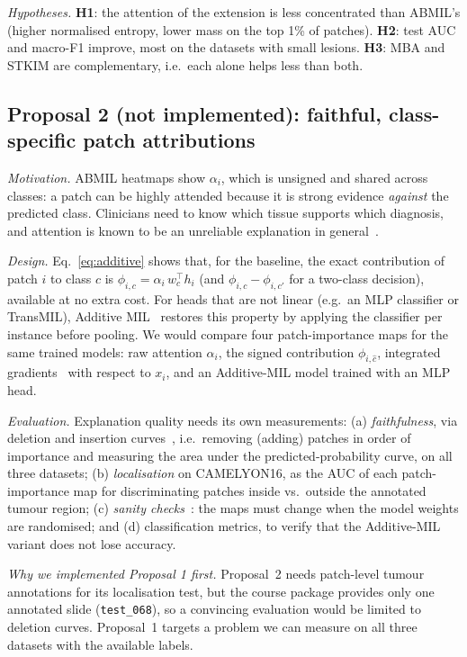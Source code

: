 \documentclass[conference]{IEEEtran}
\begin{document}
\emph{Hypotheses.} \textbf{H1}: the attention of the extension is less concentrated than ABMIL's (higher normalised entropy, lower mass on the top 1\% of patches). \textbf{H2}: test AUC and macro-F1 improve, most on the datasets with small lesions. \textbf{H3}: MBA and STKIM are complementary, i.e.\ each alone helps less than both.

\subsection{Proposal 2 (not implemented): faithful, class-specific patch attributions}\label{sec:p2}
\emph{Motivation.} ABMIL heatmaps show $\alpha_i$, which is unsigned and shared across classes: a patch can be highly attended because it is strong evidence \emph{against} the predicted class. Clinicians need to know which tissue supports which diagnosis, and attention is known to be an unreliable explanation in general~\cite{jain2019attention}.

\emph{Design.} Eq.~\eqref{eq:additive} shows that, for the baseline, the exact contribution of patch $i$ to class $c$ is $\phi_{i,c}=\alpha_i\,w_c^\top h_i$ (and $\phi_{i,c}-\phi_{i,c'}$ for a two-class decision), available at no extra cost. For heads that are not linear (e.g.\ an MLP classifier or TransMIL), Additive MIL~\cite{javed2022additive} restores this property by applying the classifier per instance before pooling. We would compare four patch-importance maps for the same trained models: raw attention $\alpha_i$, the signed contribution $\phi_{i,\hat c}$, integrated gradients~\cite{sundararajan2017ig} with respect to $x_i$, and an Additive-MIL model trained with an MLP head.

\emph{Evaluation.} Explanation quality needs its own measurements: (a) \emph{faithfulness}, via deletion and insertion curves~\cite{samek2017evaluating,petsiuk2018rise}, i.e.\ removing (adding) patches in order of importance and measuring the area under the predicted-probability curve, on all three datasets; (b) \emph{localisation} on CAMELYON16, as the AUC of each patch-importance map for discriminating patches inside vs.\ outside the annotated tumour region; (c) \emph{sanity checks}~\cite{adebayo2018sanity}: the maps must change when the model weights are randomised; and (d) classification metrics, to verify that the Additive-MIL variant does not lose accuracy.

\emph{Why we implemented Proposal 1 first.} Proposal~2 needs patch-level tumour annotations for its localisation test, but the course package provides only one annotated slide (\texttt{test\_068}), so a convincing evaluation would be limited to deletion curves. Proposal~1 targets a problem we can measure on all three datasets with the available labels.
\end{document}
